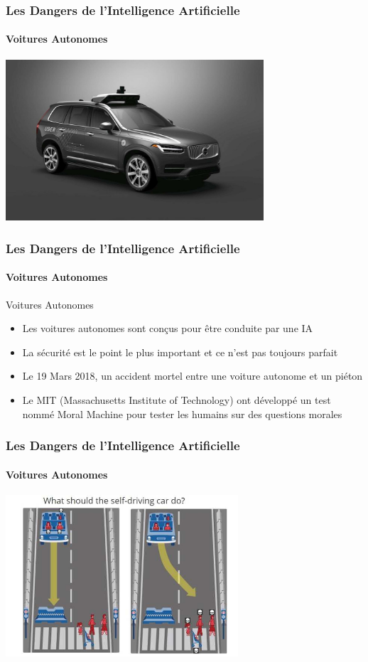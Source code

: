 \documentclass{beamer}
\begin{document}
	\begin{frame}
	\frametitle{Les Dangers de l'Intelligence Artificielle}
	\framesubtitle{Voitures Autonomes}
	\centerline{\includegraphics[height=6cm]{uber.jpg}}
	\end{frame}
	
	\begin{frame}
	\frametitle{Les Dangers de l'Intelligence Artificielle}
	\framesubtitle{Voitures Autonomes}
	\begin{block}{Voitures Autonomes}
	\begin{itemize}
	\itemsep1em
		\item Les voitures autonomes sont conçus pour être conduite par une IA
		\item La sécurité est le point le plus important et ce n'est pas toujours parfait
		\item Le 19 Mars 2018, un accident mortel entre une voiture autonome et un piéton
		\item Le MIT (Massachusetts Institute of Technology) ont développé un test nommé Moral Machine pour tester les humains sur des questions morales
	\end{itemize}
	\end{block}
	\end{frame}
	
	\begin{frame}
	\frametitle{Les Dangers de l'Intelligence Artificielle}
	\framesubtitle{Voitures Autonomes}
	\centerline{\includegraphics[height=6cm]{MIT.jpg}}
	\end{frame}
	
\end{document}
